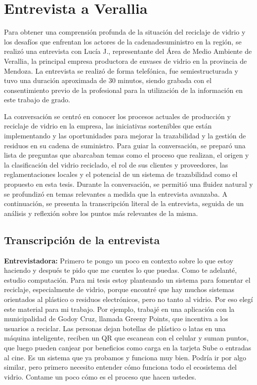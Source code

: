\chapter{Entrevista a Verallia}
\label{cp:verallia-interview}

\parindent0pt

Para obtener una comprensión profunda de la situación del reciclaje de vidrio y los desafíos que enfrentan los actores de la \gls{cadenadesuministro} en la región, se realizó una entrevista con Lucía J., representante del Área de Medio Ambiente de Verallia, la principal empresa productora de envases de vidrio en la provincia de Mendoza. La entrevista se realizó de forma telefónica, fue semiestructurada y tuvo una duración aproximada de 30 minutos, siendo grabada con el consentimiento previo de la profesional para la utilización de la información en este trabajo de grado.

La conversación se centró en conocer los procesos actuales de producción y reciclaje de vidrio en la empresa, las iniciativas sostenibles que están implementando y las oportunidades para mejorar la \gls{trazabilidad} y la gestión de residuos en su cadena de suministro. Para guiar la conversación, se preparó una lista de preguntas que abarcaban temas como el proceso que realizan, el origen y la clasificación del vidrio reciclado, el rol de sus clientes y proveedores, las reglamentaciones locales y el potencial de un sistema de trazabilidad como el propuesto en esta tesis. Durante la conversación, se permitió una fluidez natural y se profundizó en temas relevantes a medida que la entrevista avanzaba. A continuación, se presenta la transcripción literal de la entrevista, seguida de un análisis y reflexión sobre los puntos más relevantes de la misma.

\section{Transcripción de la entrevista}

\textbf{Entrevistadora:} Primero te pongo un poco en contexto sobre lo que estoy haciendo y después te pido que me cuentes lo que puedas. Como te adelanté, estudio computación. Para mi tesis estoy planteando un sistema para fomentar el reciclaje, especialmente de vidrio, porque encontré que hay muchos sistemas orientados al plástico o residuos electrónicos, pero no tanto al vidrio. Por eso elegí este material para mi trabajo. Por ejemplo, trabajé en una aplicación con la municipalidad de Godoy Cruz, llamada Greeny Points, que incentiva a los usuarios a reciclar. Las personas dejan botellas de plástico o latas en una máquina inteligente, reciben un QR que escanean con el celular y suman puntos, que luego pueden canjear por beneficios como carga en la tarjeta Sube o entradas al cine. Es un sistema que ya probamos y funciona muy bien. Podría ir por algo similar, pero primero necesito entender cómo funciona todo el ecosistema del vidrio. Contame un poco cómo es el proceso que hacen ustedes.

